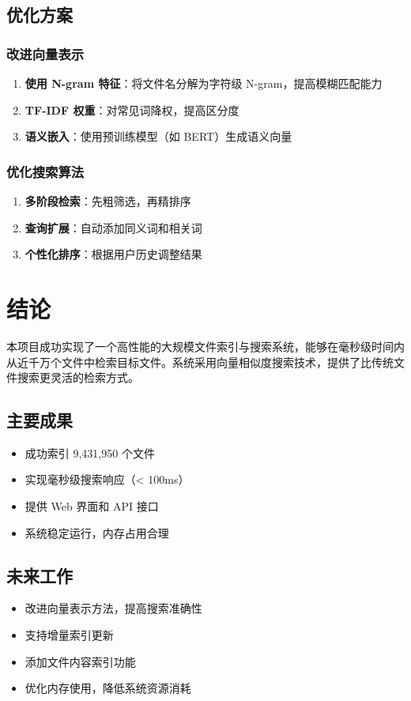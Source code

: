 \documentclass[12pt,a4paper]{article}
\begin{document}
\subsection{优化方案}

\subsubsection{改进向量表示}
\begin{enumerate}
    \item \textbf{使用 N-gram 特征}：将文件名分解为字符级 N-gram，提高模糊匹配能力
    \item \textbf{TF-IDF 权重}：对常见词降权，提高区分度
    \item \textbf{语义嵌入}：使用预训练模型（如 BERT）生成语义向量
\end{enumerate}

\subsubsection{优化搜索算法}
\begin{enumerate}
    \item \textbf{多阶段检索}：先粗筛选，再精排序
    \item \textbf{查询扩展}：自动添加同义词和相关词
    \item \textbf{个性化排序}：根据用户历史调整结果
\end{enumerate}

\section{结论}

本项目成功实现了一个高性能的大规模文件索引与搜索系统，能够在毫秒级时间内从近千万个文件中检索目标文件。系统采用向量相似度搜索技术，提供了比传统文件搜索更灵活的检索方式。

\subsection{主要成果}
\begin{itemize}
    \item 成功索引 9,431,950 个文件
    \item 实现毫秒级搜索响应（< 100ms）
    \item 提供 Web 界面和 API 接口
    \item 系统稳定运行，内存占用合理
\end{itemize}

\subsection{未来工作}
\begin{itemize}
    \item 改进向量表示方法，提高搜索准确性
    \item 支持增量索引更新
    \item 添加文件内容索引功能
    \item 优化内存使用，降低系统资源消耗
\end{itemize}
\end{document}
